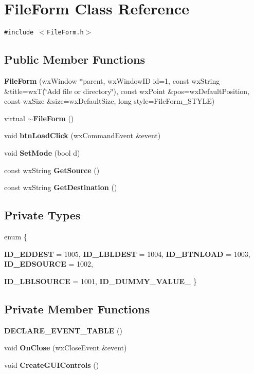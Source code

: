 \section{File\-Form Class Reference}
\label{class_file_form}
{\tt \#include $<$File\-Form.h$>$}

\subsection*{Public Member Functions}
\begin{CompactItemize}
\item 
{\bf File\-Form} (wx\-Window $\ast$parent, wx\-Window\-ID id=1, const wx\-String \&title=wx\-T(\char`\"{}Add file or directory\char`\"{}), const wx\-Point \&pos=wx\-Default\-Position, const wx\-Size \&size=wx\-Default\-Size, long style=File\-Form\_\-STYLE)
\item 
virtual {\bf $\sim$File\-Form} ()
\item 
void {\bf btn\-Load\-Click} (wx\-Command\-Event \&event)
\item 
void {\bf Set\-Mode} (bool d)
\item 
const wx\-String {\bf Get\-Source} ()
\item 
const wx\-String {\bf Get\-Destination} ()
\end{CompactItemize}
\subsection*{Private Types}
\begin{CompactItemize}
\item 
enum \{ \par
{\bf ID\_\-EDDEST} =  1005, 
{\bf ID\_\-LBLDEST} =  1004, 
{\bf ID\_\-BTNLOAD} =  1003, 
{\bf ID\_\-EDSOURCE} =  1002, 
\par
{\bf ID\_\-LBLSOURCE} =  1001, 
{\bf ID\_\-DUMMY\_\-VALUE\_\-}
 \}
\end{CompactItemize}
\subsection*{Private Member Functions}
\begin{CompactItemize}
\item 
{\bf DECLARE\_\-EVENT\_\-TABLE} ()
\item 
void {\bf On\-Close} (wx\-Close\-Event \&event)
\item 
void {\bf Create\-GUIControls} ()
\end{CompactItemize}
